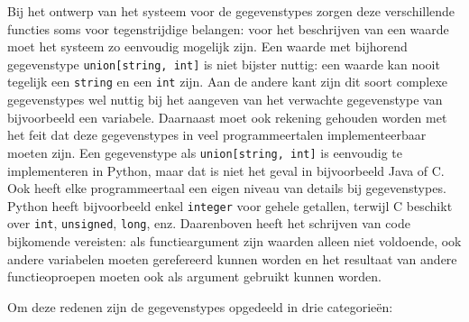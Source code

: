 Bij het ontwerp van het systeem voor de gegevenstypes zorgen deze verschillende functies soms voor tegenstrijdige belangen: voor het beschrijven van een waarde moet het systeem zo eenvoudig mogelijk zijn.
Een waarde met bijhorend gegevenstype \texttt{union[string, int]} is niet bijster nuttig: een waarde kan nooit tegelijk een \texttt{string} en een \texttt{int} zijn.
Aan de andere kant zijn dit soort complexe gegevenstypes wel nuttig bij het aangeven van het verwachte gegevenstype van bijvoorbeeld een variabele.
Daarnaast moet ook rekening gehouden worden met het feit dat deze gegevenstypes in veel programmeertalen implementeerbaar moeten zijn.
Een gegevenstype als \texttt{union[string, int]} is eenvoudig te implementeren in Python, maar dat is niet het geval in bijvoorbeeld Java of C\@.
Ook heeft elke programmeertaal een eigen niveau van details bij gegevenstypes.
Python heeft bijvoorbeeld enkel \texttt{integer} voor gehele getallen, terwijl C beschikt over \texttt{int}, \texttt{unsigned}, \texttt{long}, enz.
Daarenboven heeft het schrijven van code bijkomende vereisten: als functieargument zijn waarden alleen niet voldoende, ook andere variabelen moeten gerefereerd kunnen worden en het resultaat van andere functieoproepen moeten ook als argument gebruikt kunnen worden.

Om deze redenen zijn de gegevenstypes opgedeeld in drie categorieën:

